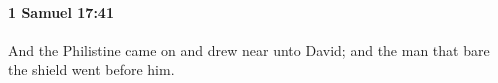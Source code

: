 
		\paragraph{1 Samuel 17:41} %
			\label{1SAMUEL-17-41}

			And the Philistine came on and drew near unto David; and the man that bare the shield went before him.


